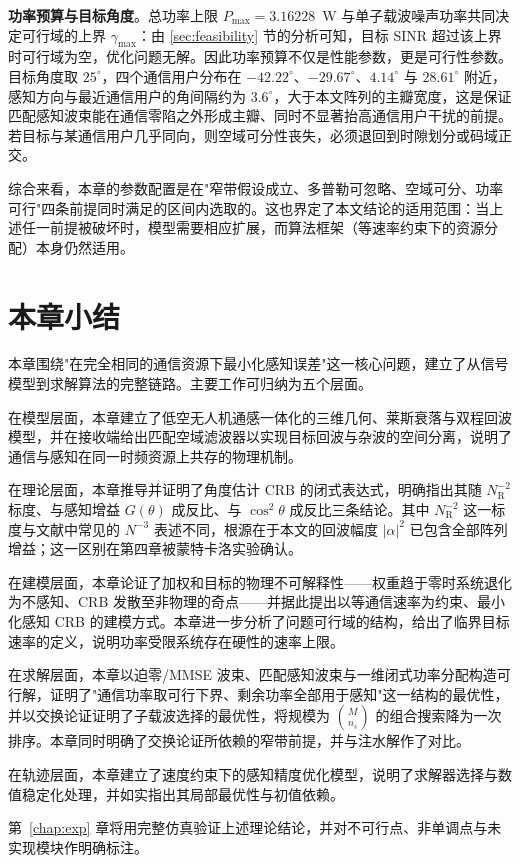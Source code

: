 \textbf{功率预算与目标角度}。总功率上限 $P_{\max}=3.16228$~W 与单子载波噪声功率共同决定可行域的上界 $\gamma_{\max}$：由 \ref{sec:feasibility} 节的分析可知，目标 SINR 超过该上界时可行域为空，优化问题无解。因此功率预算不仅是性能参数，更是可行性参数。目标角度取 $25^{\circ}$，四个通信用户分布在 $-42.22^{\circ}$、$-29.67^{\circ}$、$4.14^{\circ}$ 与 $28.61^{\circ}$ 附近，感知方向与最近通信用户的角间隔约为 $3.6^{\circ}$，大于本文阵列的主瓣宽度，这是保证匹配感知波束能在通信零陷之外形成主瓣、同时不显著抬高通信用户干扰的前提。若目标与某通信用户几乎同向，则空域可分性丧失，必须退回到时隙划分或码域正交。

综合来看，本章的参数配置是在"窄带假设成立、多普勒可忽略、空域可分、功率可行"四条前提同时满足的区间内选取的。这也界定了本文结论的适用范围：当上述任一前提被破坏时，模型需要相应扩展，而算法框架（等速率约束下的资源分配）本身仍然适用。

\section{本章小结}
\label{sec:method_summary}

本章围绕"在完全相同的通信资源下最小化感知误差"这一核心问题，建立了从信号模型到求解算法的完整链路。主要工作可归纳为五个层面。

在模型层面，本章建立了低空无人机通感一体化的三维几何、莱斯衰落与双程回波模型，并在接收端给出匹配空域滤波器以实现目标回波与杂波的空间分离，说明了通信与感知在同一时频资源上共存的物理机制。

在理论层面，本章推导并证明了角度估计 CRB 的闭式表达式，明确指出其随 $N_{\mathrm{R}}^{-2}$ 标度、与感知增益 $G(\theta)$ 成反比、与 $\cos^{2}\theta$ 成反比三条结论。其中 $N_{\mathrm{R}}^{-2}$ 这一标度与文献中常见的 $N^{-3}$ 表述不同，根源在于本文的回波幅度 $\lvert\alpha\rvert^{2}$ 已包含全部阵列增益；这一区别在第四章被蒙特卡洛实验确认。

在建模层面，本章论证了加权和目标的物理不可解释性——权重趋于零时系统退化为不感知、CRB 发散至非物理的奇点——并据此提出以等通信速率为约束、最小化感知 CRB 的建模方式。本章进一步分析了问题可行域的结构，给出了临界目标速率的定义，说明功率受限系统存在硬性的速率上限。

在求解层面，本章以迫零/MMSE 波束、匹配感知波束与一维闭式功率分配构造可行解，证明了"通信功率取可行下界、剩余功率全部用于感知"这一结构的最优性，并以交换论证证明了子载波选择的最优性，将规模为 $\binom{M}{n_s}$ 的组合搜索降为一次排序。本章同时明确了交换论证所依赖的窄带前提，并与注水解作了对比。

在轨迹层面，本章建立了速度约束下的感知精度优化模型，说明了求解器选择与数值稳定化处理，并如实指出其局部最优性与初值依赖。

第~\ref{chap:exp} 章将用完整仿真验证上述理论结论，并对不可行点、非单调点与未实现模块作明确标注。

